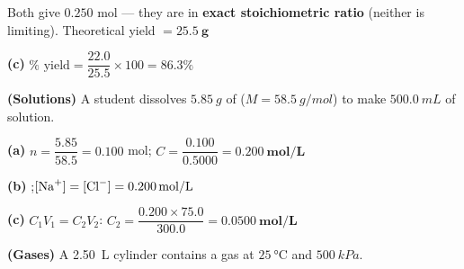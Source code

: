\documentclass[addpoints]{exam}
\begin{document}
\begin{questions}
\begin{solution}[9cm]
Both give $0.250$ mol — they are in \textbf{exact stoichiometric ratio} (neither is limiting).
Theoretical yield $= \mathbf{\SI{25.5}{g}}$

\textbf{(c)} $\%\text{ yield} = \dfrac{22.0}{25.5}\times100 = \mathbf{86.3\%}$
\end{solution}

\question \textbf{(Solutions)} A student dissolves $\SI{5.85}{g}$ of 
($M = \SI{58.5}{g/mol}$) to make $\SI{500.0}{mL}$ of solution.
\begin{solution}[8cm]
\textbf{(a)} $n = \dfrac{5.85}{58.5} = 0.100$ mol;\quad
$C = \dfrac{0.100}{0.5000} = \mathbf{\SI{0.200}{mol/L}}$

\textbf{(b)} ;\quad $[\ce{Na+}] = [\ce{Cl-}] = \mathbf{\SI{0.200}{mol/L}}$

\textbf{(c)} $C_1V_1 = C_2V_2$:\quad
$C_2 = \dfrac{0.200 \times 75.0}{300.0} = \mathbf{\SI{0.0500}{mol/L}}$
\end{solution}

\question \textbf{(Gases)} A \SI{2.50}{L} cylinder contains a gas at $\SI{25}{\celsius}$
and $\SI{500}{kPa}$.
\end{questions}
\end{document}
